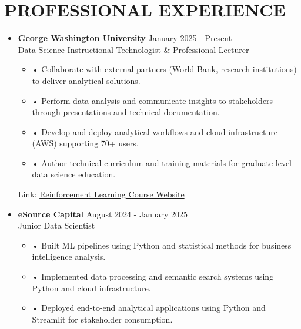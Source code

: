 \documentclass[a4paper,9pt]{extarticle}
\begin{document}

\section*{PROFESSIONAL EXPERIENCE}

\begin{itemize}[leftmargin=0.4cm, label={}]
    \item \textbf{George Washington University} \hfill January 2025 - Present \\
    Data Science Instructional Technologist \& Professional Lecturer
    \vspace{-0.1cm}
    \begin{itemize}[leftmargin=0.3cm, label={}]
    \item \small{•} \normalsize{Collaborate with external partners (World Bank, research institutions) to deliver analytical solutions.}
    \item \small{•} \normalsize{Perform data analysis and communicate insights to stakeholders through presentations and technical documentation.}
    \item \small{•} \normalsize{Develop and deploy analytical workflows and cloud infrastructure (AWS) supporting 70+ users.}
    \item \small{•} \normalsize{Author technical curriculum and training materials for graduate-level data science education.}
    \end{itemize}
    Link: \href{https://twallett.com/courses/reinforcement-learning/}{Reinforcement Learning Course Website}
\end{itemize}

\noindent
\begin{itemize}[leftmargin=0.4cm, label={}]
    \item \textbf{eSource Capital} \hfill August 2024 - January 2025 \\
    Junior Data Scientist 
    \vspace{-0.1cm}
    \begin{itemize}[leftmargin=0.3cm, label={}]
\item \small{•} \normalsize{Built ML pipelines using Python and statistical methods for business intelligence analysis.}
    \item \small{•} \normalsize{Implemented data processing and semantic search systems using Python and cloud infrastructure.}
    \item \small{•} \normalsize{Deployed end-to-end analytical applications using Python and Streamlit for stakeholder consumption.}
    \end{itemize}
\end{itemize}
\end{document}
